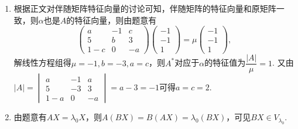 \begin{enumerate}
    \item 根据正文对伴随矩阵特征向量的讨论可知，伴随矩阵的特征向量和原矩阵一致，则$\alpha$也是$A$的特征向量，则由题意有
          \[\begin{pmatrix}
                  a & -1 & c \\ 5 & b & 3 \\ 1-c & 0 & -a
              \end{pmatrix}\begin{pmatrix}
                  -1 \\ -1 \\ 1
              \end{pmatrix}=\mu\begin{pmatrix}
                  -1 \\ -1 \\ 1
              \end{pmatrix},\]
          解线性方程组得$\mu=-1,b=-3,a=c$，则$A^*$对应于$\alpha$的特征值为$\dfrac{|A|}{\mu}=1$. 又由$|A|=\begin{vmatrix}
                  a & -1 & a \\ 5 & -3 & 3 \\ 1-a & 0 & -a
              \end{vmatrix}=a-3=-1$可得$a=c=2$.

    \item \label{ex:18:交换基础} 由题意有$AX=\lambda_0X$，则$A(BX)=B(AX)=\lambda_0(BX)$，可见$BX\in V_{\lambda_0}$.
\end{enumerate}

